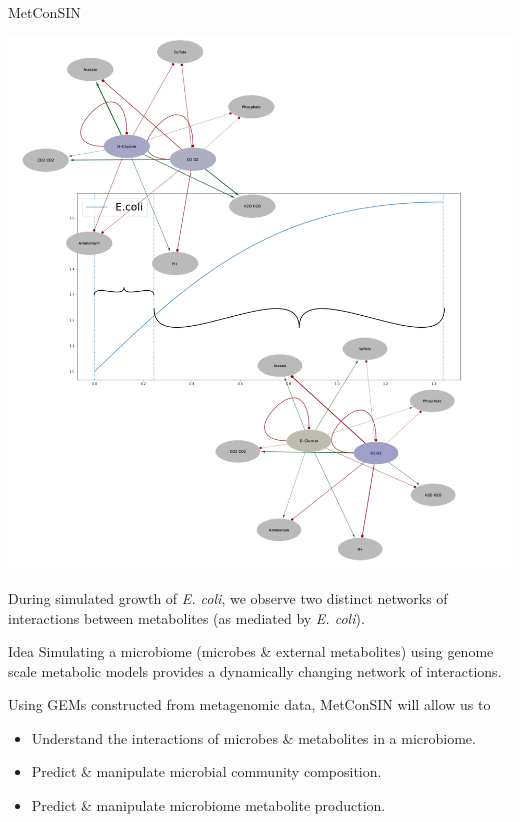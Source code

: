 \documentclass[aspectratio=1610]{beamer}
\begin{document}
\begin{frame}{MetConSIN}
\begin{minipage}{0.45\textwidth}
\begin{center}
\includegraphics[scale =0.18]{metabolites.pdf}
\end{center}

{\tiny During simulated growth of \emph{E. coli}, we observe two distinct networks of interactions between metabolites (as mediated by \emph{E. coli}).}

\end{minipage}\hspace{1cm}
\begin{minipage}{0.45\textwidth}
\begin{block}{Idea}
Simulating a microbiome (microbes \& external metabolites) using genome scale metabolic models provides a dynamically changing network of interactions.
\end{block}
\vspace{0.4cm}

{\small Using GEMs constructed from metagenomic data, MetConSIN will allow us to

\begin{itemize}
\item Understand the interactions of microbes \& metabolites in a microbiome.
\item Predict \& manipulate microbial community composition.
\item Predict \& manipulate microbiome metabolite production.
\end{itemize}
}
\end{minipage}

\end{frame}
\end{document}
